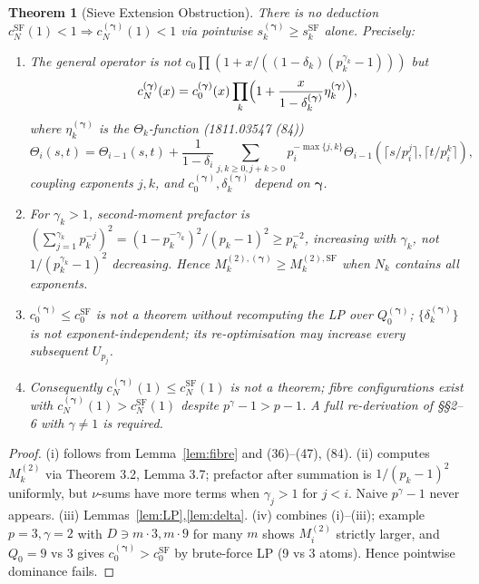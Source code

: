 \documentclass[11pt,a4paper]{article}
\theoremstyle{plain}
\newtheorem{theorem}{Theorem}[section]
\theoremstyle{definition}
\theoremstyle{remark}
\begin{document}
\begin{theorem}[Sieve Extension Obstruction]\label{thm:obstr}
There is no deduction $c_{N}^{\mathrm{SF}}(1)<1\Rightarrow c_{N}^{(\boldsymbol\gamma)}(1)<1$ via pointwise $s_{k}^{(\boldsymbol\gamma)}\ge s_{k}^{\mathrm{SF}}$ alone. Precisely:
\begin{enumerate}
\item[(i)] The general operator is not $c_{0}\prod(1+x/((1-\delta_{k})(p_{k}^{\gamma_{k}}-1)))$ but
\[
c_{N}^{(\boldsymbol\gamma)}(x)=c_{0}^{(\boldsymbol\gamma)}(x)\prod_{k}\Bigl(1+\frac{x}{1-\delta_{k}^{(\boldsymbol\gamma)}}\eta_{k}^{(\boldsymbol\gamma)}\Bigr),
\]
where $\eta_{k}^{(\boldsymbol\gamma)}$ is the $\Theta_{k}$-function (1811.03547 (84))
\[
\Theta_{i}(s,t)=\Theta_{i-1}(s,t)+\frac{1}{1-\delta_{i}}\sum_{j,k\ge0,j+k>0}p_{i}^{-\max\{j,k\}}\Theta_{i-1}(\lceil s/p_{i}^{j}\rceil,\lceil t/p_{i}^{k}\rceil),
\]
coupling exponents $j,k$, and $c_{0}^{(\boldsymbol\gamma)},\delta_{k}^{(\boldsymbol\gamma)}$ depend on $\boldsymbol\gamma$.
\item[(ii)] For $\gamma_{k}>1$, second-moment prefactor is $(\sum_{j=1}^{\gamma_{k}}p_{k}^{-j})^{2}=(1-p_{k}^{-\gamma_{k}})^{2}/(p_{k}-1)^{2}\ge p_{k}^{-2}$, increasing with $\gamma_{k}$, not $1/(p_{k}^{\gamma_{k}}-1)^{2}$ decreasing. Hence $M_{k}^{(2),(\boldsymbol\gamma)}\ge M_{k}^{(2),\mathrm{SF}}$ when $N_{k}$ contains all exponents.
\item[(iii)] $c_{0}^{(\boldsymbol\gamma)}\le c_{0}^{\mathrm{SF}}$ is not a theorem without recomputing the LP over $Q_{0}^{(\boldsymbol\gamma)}$; $\{\delta_{k}^{(\boldsymbol\gamma)}\}$ is not exponent-independent; its re-optimisation may increase every subsequent $U_{p_{j}}$.
\item[(iv)] Consequently $c_{N}^{(\boldsymbol\gamma)}(1)\le c_{N}^{\mathrm{SF}}(1)$ is not a theorem; fibre configurations exist with $c_{N}^{(\boldsymbol\gamma)}(1)>c_{N}^{\mathrm{SF}}(1)$ despite $p^{\gamma}-1>p-1$. A full re-derivation of \S\S2--6 with $\gamma\neq1$ is required.
\end{enumerate}
\end{theorem}
\begin{proof}
(i) follows from Lemma~\ref{lem:fibre} and (36)--(47), (84). (ii) computes $M_{k}^{(2)}$ via Theorem 3.2, Lemma 3.7; prefactor after summation is $1/(p_{k}-1)^{2}$ uniformly, but $\nu$-sums have more terms when $\gamma_{j}>1$ for $j<i$. Naive $p^{\gamma}-1$ never appears. (iii) Lemmas~\ref{lem:LP},\ref{lem:delta}. (iv) combines (i)--(iii); example $p=3,\gamma=2$ with $D\ni m\cdot3,m\cdot9$ for many $m$ shows $M_{i}^{(2)}$ strictly larger, and $Q_{0}=9$ vs $3$ gives $c_{0}^{(\boldsymbol\gamma)}>c_{0}^{\mathrm{SF}}$ by brute-force LP (9 vs 3 atoms). Hence pointwise dominance fails.
\end{proof}
\end{document}
